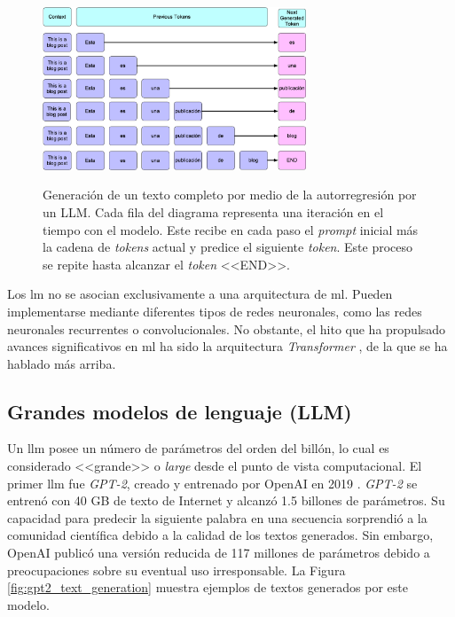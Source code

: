 \begin{figure}[H]
    \caption[Generación de un texto completo por medio de la autorregresión por un LLM]{Generación de un texto completo por medio de la autorregresión por un LLM. Cada fila del diagrama representa una iteración en el tiempo con el modelo. Este recibe en cada paso el \emph{prompt} inicial más la cadena de \emph{tokens} actual y predice el siguiente \emph{token}. Este proceso se repite hasta alcanzar el \emph{token} <<END>>.}
    \centering
    \includegraphics[width=0.7\textwidth]{./figuras/text-gen-diagram-autoregressive.png}
    \label{fig:llm_generation_example}
\end{figure}

Los \gls{lm} no se asocian exclusivamente a una arquitectura de \gls{ml}. Pueden implementarse mediante diferentes tipos de redes neuronales, como las redes neuronales recurrentes o convolucionales. No obstante, el hito que ha propulsado avances significativos en \gls{ml} ha sido la arquitectura \emph{Transformer} \citep{vaswaniAttentionAllYou2017}, de la que se ha hablado más arriba.

\subsection{Grandes modelos de lenguaje (LLM)}

Un \gls{llm} posee un número de parámetros del orden del billón, lo cual es considerado <<grande>> o \emph{large} desde el punto de vista computacional. El primer \gls{llm} fue \emph{GPT-2}, creado y entrenado por OpenAI en 2019 \citep{radfordLanguageModelsAre2019}. \emph{GPT-2} se entrenó con 40 GB de texto de Internet y alcanzó 1.5 billones de parámetros. Su capacidad para predecir la siguiente palabra en una secuencia sorprendió a la comunidad científica debido a la calidad de los textos generados. Sin embargo, OpenAI publicó una versión reducida de 117 millones de parámetros debido a preocupaciones sobre su eventual uso irresponsable. La Figura \ref{fig:gpt2_text_generation} muestra ejemplos de textos generados por este modelo.

